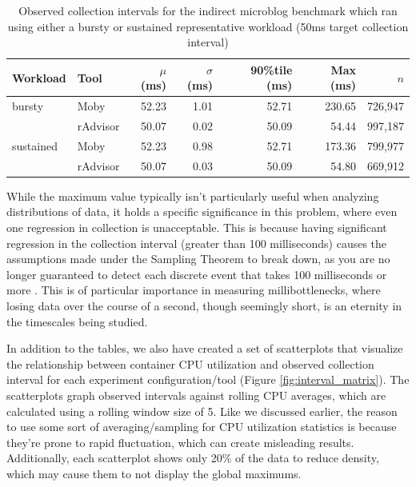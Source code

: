 \documentclass[a4paper,11pt]{article}
\begin{document}
\begin{table}[H]
    \vspace{0.1em}
    \caption{
        Observed collection intervals for the indirect microblog benchmark
        which ran using either a bursty or sustained representative workload
        (50ms target collection interval)
    }
    \vspace{1em}
    \centering
    \begin{adjustbox}{max width=\textwidth}
        \begin{tabular}{llrrrrr@{}}
            \toprule
            \textbf{Workload} & \textbf{Tool} &
            \textbf{$\mu$ (ms)} & \textbf{$\sigma$ (ms)} &
            \textbf{90\%tile (ms)} & \textbf{Max (ms)} & \textbf{$n$} \\
            \midrule
            bursty & Moby    & 52.23 & 1.01 & 52.71 & 230.65 & 726,947 \\
            & rAdvisor       & 50.07 & 0.02 & 50.09 &  54.44 & 997,187 \\
            \midrule
            sustained & Moby & 52.23 & 0.98 & 52.71 & 173.36 & 799,977 \\
            & rAdvisor       & 50.07 & 0.03 & 50.09 &  54.80 & 669,912 \\
            \bottomrule
        \end{tabular}
    \end{adjustbox}
    \label{tab:ii_interval_results}
    \vspace{-1.2em}
\end{table}

While the maximum value typically isn't particularly useful when analyzing distributions of data,
it holds a specific significance in this problem,
where even one regression in collection is unacceptable.
This is because having significant regression in the collection interval
(greater than 100 milliseconds)
causes the assumptions made under the Sampling Theorem to break down,
as you are no longer guaranteed to detect each discrete event that takes 100 milliseconds or more \cite{SamplingTheorem}. 
This is of particular importance in measuring millibottlenecks, where losing data over the course of a second,
though seemingly short,
is an eternity in the timescales being studied.

In addition to the tables, we also have created a set of scatterplots that visualize
the relationship between container CPU utilization and observed collection interval
for each experiment configuration/tool (Figure \ref{fig:interval_matrix}).
The scatterplots graph observed intervals against rolling CPU averages,
which are calculated using a rolling window size of 5.
Like we discussed earlier, the reason to use some sort of averaging/sampling for CPU
utilization statistics is because they're prone to rapid fluctuation,
which can create misleading results.
Additionally, each scatterplot shows only 20\% of the data
to reduce density,
which may cause them to not display the global maximums.
\end{document}
